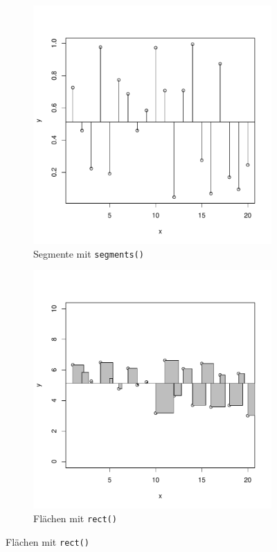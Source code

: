 \begin{figure}[h!]
\begin{subfigure}[b]{0.48\textwidth}
\includegraphics{r-cmd-025}
\caption{Segmente mit \lstinline{segments()}}
\end{subfigure}
\begin{subfigure}[b]{0.48\textwidth}
\includegraphics{r-cmd-026}
\caption{Flächen mit \lstinline{rect()}}
\end{subfigure}

\end{figure}

